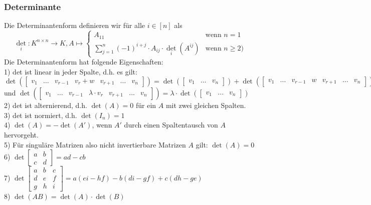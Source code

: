 \documentclass{article}
\begin{document}
\subsubsection*{Determinante}
Die Determinantenform definieren wir für alle \(i \in [n]\) als
\[{\det_i}: K^{n \times n} \rightarrow K, A \mapsto \begin{cases}
    A_{11} & \text{wenn } n = 1 \\
    \sum_{j = 1}^{n} (-1)^{i+j}\cdot A_{ij} \cdot \det_i(A^{ij}) & \text{wenn } n \ge 2 )
\end{cases}\]
Die Determinantenform hat folgende Eigenschaften: \\
1) det ist linear in jeder Spalte, d.h. es gilt:\\
\(\det(\begin{bmatrix}
        v_1 & \hdots & v_{r-1} & v_r + w & v_{r+1} & \hdots & v_n
\end{bmatrix}) = \det(\begin{bmatrix}
    v_1 & \hdots & v_n
\end{bmatrix}) + \det(\begin{bmatrix}
    v_1 & \hdots & v_{r-1} & w & v_{r+1} & \hdots & v_n
\end{bmatrix})\) und \(\det(\begin{bmatrix}
    v_1 & \hdots & v_{r-1} & \lambda \cdot v_r & v_{r+1} & \hdots & v_n
\end{bmatrix}) = \lambda \cdot \det(\begin{bmatrix}
    v_1 & \hdots & v_n
\end{bmatrix})\) \\
2) det ist alternierend, d.h. \(\det(A) = 0\) für ein \(A\) mit zwei gleichen Spalten. \\
3) det ist normiert, d.h. \(\det(I_n) = 1\) \\
4) \(\det(A) = -\det(A')\), wenn \(A'\) durch einen Spaltentausch von \(A\) hervorgeht. \\
5) Für singuläre Matrizen also nicht invertierbare Matrizen \(A\) gilt: \(\det(A) = 0\) \\
6) \(\det \begin{bmatrix}
    a & b \\
    c & d
\end{bmatrix} = ad - cb\) \\
7) \(\det \begin{bmatrix}
    a & b & c \\
    d & e & f \\
    g & h & i
\end{bmatrix} = a(ei - hf) - b(di - gf) + c(dh - ge)\) \\
8) \(\det(AB) = \det(A) \cdot \det(B)\)
\end{document}
